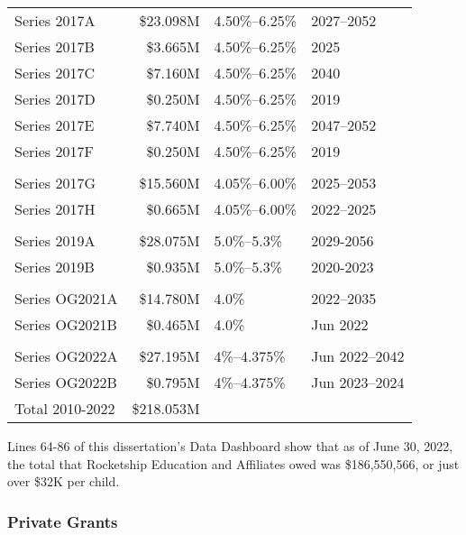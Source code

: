 \begin{table}[htp]
\begin{tabularx}{\textwidth}{lrll}
    Series 2017A     & \$23.098M & 4.50\%–6.25\%  & 2027–2052      \\
    Series 2017B     & \$3.665M  & 4.50\%–6.25\%  & 2025           \\
    Series 2017C     & \$7.160M  & 4.50\%–6.25\%  & 2040           \\
    Series 2017D     & \$0.250M  & 4.50\%–6.25\%  & 2019           \\
    Series 2017E     & \$7.740M  & 4.50\%–6.25\%  & 2047–2052      \\
    Series 2017F     & \$0.250M  & 4.50\%–6.25\%  & 2019           \\
                                                                   \\
    Series 2017G     & \$15.560M & 4.05\%–6.00\%  & 2025–2053      \\
    Series 2017H     & \$0.665M  &  4.05\%–6.00\% & 2022–2025      \\
                                                                   \\
    Series 2019A     & \$28.075M & 5.0\%–5.3\%    & 2029-2056      \\
    Series 2019B     & \$0.935M  & 5.0\%–5.3\%    & 2020-2023      \\
                                                                   \\
    Series OG2021A   & \$14.780M & 4.0\%          & 2022–2035      \\
    Series OG2021B   & \$0.465M  & 4.0\%          & Jun 2022       \\
                                                                   \\
    Series OG2022A   & \$27.195M & 4\%–4.375\%    & Jun 2022–2042  \\
    Series OG2022B   & \$0.795M  & 4\%–4.375\%    & Jun 2023–2024  \\
    \midrule
    Total 2010-2022  & \$218.053M                                  \\
    \bottomrule
  \end{tabularx}
\end{table}

Lines 64-86 of this dissertation's Data Dashboard show that as of June 30, 2022, the total that Rocketship Education and Affiliates owed was \$186,550,566, or just over \$32K per child.

\subsubsection{Private Grants}%
\label{sec:private-grants}\indent%

